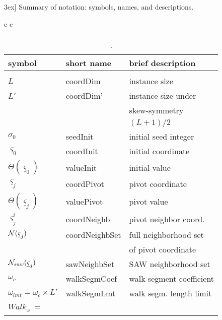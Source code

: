 \begin{table*}[t]
\footnotesize%
\caption[From the file tb-labs-wide-notation-summary.tex][3ex]
{Summary of notation: symbols, names, and descriptions.}
\label{tb-labs-wide-notation-summary}
\centering
\begin{tabular}[]{c c}
\begin{tabular}[t]{l l l}  
\centering
\bf{symbol}  & \bf{short name} & \bf{brief description} \\ \hline\\[-1.25ex]
$L$ & coordDim & instance size \\[1.25ex]
$L'$ & coordDim'& instance size under  \\[-0.25ex]
      &          &  skew-symmetry   \\[-0.25ex]
      &          &  $(L+1)/2 $ \\[1.25ex]
$\sigma_0$ &  seedInit     &  initial seed integer \\[1.05ex]
${\underline \varsigma}_0$ & coordInit & initial coordinate \\[1.05ex]
$\Theta({\underline \varsigma}_0)$ & valueInit & initial value \\[1.05ex]
${\underline \varsigma}_j$ & coordPivot & pivot coordinate\\[1.75ex]
$\Theta({\underline \varsigma}_j)$ & valuePivot & pivot value \\[1.75ex]
${\underline \varsigma}_j^i$ & coordNeighb & pivot neighbor coord. \\[1.75ex] %
${\cal N} ({\underline \varsigma}_j)$ & coordNeighbSet & full neighborhood set \\[-0.45ex] %
                                      &                & of pivot coordinate \\[1.75ex] 
{${\cal N}_{saw} ({\underline \varsigma}_j)$} & {sawNeighbSet} & {SAW neighborhood set} \\[+1.15ex] 
$\omega_c$     & walkSegmCoef &  walk segment coefficient\\[+01.20ex]  
$\omega_{lmt} = \omega_c \times L' $ & walkSegmLmt & walk segm. length limit\\[1.75ex] 
{$Walk_{\omega} ~= $}  & {~~~} & {~~~} \\[0.25ex]

\end{tabular}
\end{tabular}
\end{table*}
